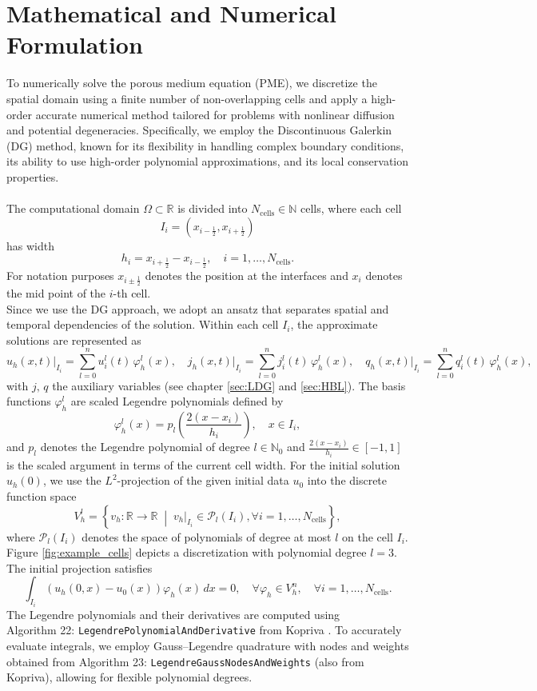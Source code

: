 \documentclass[a4paper,12pt]{paper}
\begin{document}
\section{Mathematical and Numerical Formulation}
To numerically solve the porous medium equation (PME), we discretize the spatial domain using a finite number of non-overlapping cells and apply a high-order accurate numerical method tailored for problems with nonlinear diffusion and potential degeneracies. Specifically, we employ the Discontinuous Galerkin (DG) method, known for its flexibility in handling complex boundary conditions, its ability to use high-order polynomial approximations, and its local conservation properties.\\
\\
The computational domain $\Omega\subset\mathbb{R}$ is divided into \( N_{\text{cells}} \in \mathbb{N} \) cells, where each cell
\[
I_i = \left(x_{i-\frac{1}{2}}, x_{i+\frac{1}{2}}\right)
\]
has width 
\[
h_i = x_{i+\frac{1}{2}} - x_{i-\frac{1}{2}}, \quad i = 1, \ldots, N_{\text{cells}}.
\]For notation purposes $x_{i\pm\frac{1}{2}}$ denotes the position at the interfaces and $x_i$ denotes the mid point of the $i$-th cell.\\
Since we use the DG approach, we adopt an ansatz that separates spatial and temporal dependencies of the solution. Within each cell \( I_i \), the approximate solutions are represented as
\[
u_h(x,t)\big|_{I_i} = \sum_{l=0}^n u_i^l(t)\,\varphi_h^l(x), \quad
j_h(x,t)\big|_{I_i} = \sum_{l=0}^n j_i^l(t)\,\varphi_h^l(x), \quad
q_h(x,t)\big|_{I_i} = \sum_{l=0}^n q_i^l(t)\,\varphi_h^l(x),
\]
with $j,\,q$ the auxiliary variables (see chapter \ref{sec:LDG} and \ref{sec:HBL}). The basis functions \(\varphi_h^l\) are scaled Legendre polynomials defined by
\[
\varphi_h^l(x) = p_l\left(\frac{2(x - x_i)}{h_i}\right), \quad x \in I_i,
\]
and \( p_l \) denotes the Legendre polynomial of degree  \( l \in \mathbb{N}_0 \) and $\frac{2(x - x_i)}{h_i}\in [-1,1]$ is the scaled argument in terms of the current cell width.
For the initial solution \( u_h(0) \), we use the \( L^2 \)-projection of the given initial data \( u_0 \) into the discrete function space
\[
V_h^l = \left\{ v_h : \mathbb{R} \to \mathbb{R} \;\middle|\; v_h|_{I_i} \in \mathcal{P}_l(I_i), \forall i=1,\ldots,N_{\text{cells}} \right\},
\]
where \( \mathcal{P}_l(I_i) \) denotes the space of polynomials of degree at most \( l \) on the cell \( I_i \). Figure \ref{fig:example_cells} depicts a discretization with polynomial degree $l=3$. The initial projection satisfies
\[
\int_{I_i} \left(u_h(0,x) - u_0(x)\right) \varphi_h(x) \, dx = 0, \quad \forall \varphi_h \in V_h^n, \quad \forall i=1,\ldots,N_{\text{cells}}.
\]
The Legendre polynomials and their derivatives are computed using\\ Algorithm 22: \texttt{LegendrePolynomialAndDerivative} from Kopriva \cite{Kopriva2009}. To accurately evaluate integrals, we employ Gauss–Legendre quadrature with nodes and weights obtained from Algorithm 23: \texttt{LegendreGaussNodesAndWeights} (also from Kopriva), allowing for flexible polynomial degrees.
\end{document}
